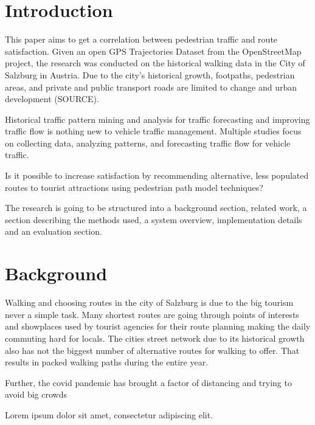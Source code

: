 

\section{Introduction}
\label{section:Introduction}

This paper aims to get a correlation between pedestrian traffic and route satisfaction. Given an open GPS Trajectories Dataset from the OpenStreetMap project, the research was conducted on the historical walking data in the City of Salzburg in Austria. Due to the city's historical growth, footpaths, pedestrian areas, and private and public transport roads are limited to change and urban development (SOURCE). 

\autocite[]{Netsch2021}

Historical traffic pattern mining and analysis for traffic forecasting and improving traffic flow is nothing new to vehicle traffic management. Multiple studies focus on collecting data, analyzing patterns, and forecasting traffic flow for vehicle traffic. 

Is it possible to increase satisfaction by recommending alternative, less populated routes to tourist attractions using pedestrian path model techniques?

The research is going to be structured into a background section, related work, a section describing the methods used, a system overview, implementation details and an evaluation section.

\section{Background}
Walking and choosing routes in the city of Salzburg is due to the big tourism never a simple task. Many shortest routes are going through points of interests and showplaces used by tourist agencies for their route planning making the daily commuting hard for locals. The cities street network due to its historical growth also has not the biggest number of alternative routes for walking to offer. That results in packed walking paths during the entire year.

Further, the covid pandemic has brought a factor of distancing and trying to avoid big crowds 


Lorem ipsum dolor sit amet, consectetur adipiscing elit. 

